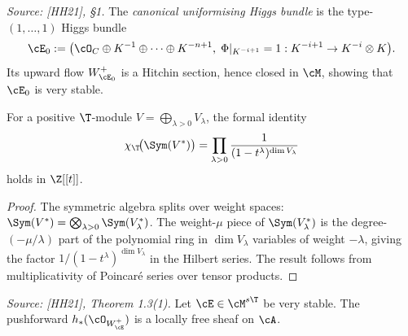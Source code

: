 \begin{definition}
  \label{def:canonical_uniformising}
  \textit{Source: [HH21], §1.}
  The \emph{canonical uniformising Higgs bundle} is the type-\((1,\ldots,1)\) Higgs bundle
  \[
    \cE_0 := \bigl(\cO_C \oplus K^{-1} \oplus \cdots \oplus K^{-n+1},\;
    \Phi|_{K^{-i+1}} = 1 : K^{-i+1} \to K^{-i} \otimes K\bigr).
  \]
  Its upward flow \(W^+_{\cE_0}\) is a Hitchin section, hence closed in \(\cM\), showing that
  \(\cE_0\) is very stable.
\end{definition}

\begin{lemma}
  \label{lem:T_char_product}
  For a positive \(\T\)-module \(V = \bigoplus_{\lambda > 0} V_\lambda\), the formal identity
  \[
    \chi_{\T}\!\bigl(\Sym(V^*)\bigr)
    = \prod_{\lambda > 0} \frac{1}{(1 - t^\lambda)^{\dim V_\lambda}}
  \]
  holds in \(\Z[[t]]\).
\end{lemma}

\begin{proof}
  The symmetric algebra splits over weight spaces: \(\Sym(V^*) = \bigotimes_{\lambda > 0} \Sym(V^*_\lambda)\).
  The weight-\(\mu\) piece of \(\Sym(V^*_\lambda)\) is the degree-\((-\mu/\lambda)\) part of
  the polynomial ring in \(\dim V_\lambda\) variables of weight \(-\lambda\), giving the factor
  \(1/(1-t^\lambda)^{\dim V_\lambda}\) in the Hilbert series.  The result follows from
  multiplicativity of Poincaré series over tensor products.
\end{proof}

\begin{lemma}
  \label{lem:pushforward_locally_free}
  \textit{Source: [HH21], Theorem 1.3(1).}
  Let \(\cE \in \cM^{s\T}\) be very stable.  The pushforward
  \(h_*(\cO_{W^+_{\cE}})\) is a locally free sheaf on \(\cA\).
\end{lemma}

